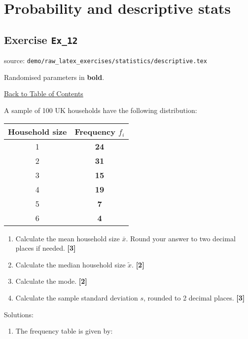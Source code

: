 \documentclass[a4paper, leqno, 12pt]{report}
\newenvironment{top_enumerate}{
\begin{enumerate}
  \setlength{\itemsep}{2em}
  \setlength{\topsep}{-0pt}
  \setlength{\partopsep}{-0pt}
}{\end{enumerate}}
\begin{document}
\section{Probability and descriptive stats}
\subsection{Exercise \texttt{Ex\_12}}
source: \texttt{demo/raw\_latex\_exercises/statistics/descriptive.tex}

Randomised parameters in \textbf{bold}. 

\hyperlink{contents}{Back to Table of Contents}
\begin{top_enumerate}
\item A sample of 100 UK households have the following distribution:

\begin{center}
\begin{tabular}{cc}
Household size & Frequency $f_i$ \\
\hline
1 & {\bf 24} \\
2 & {\bf 31} \\
3 & {\bf 15} \\
4 & {\bf 19} \\
5 & {\bf 7} \\
6 & {\bf 4} \\
\hline
\end{tabular}
\end{center}
 
\setcounter{equation}{0}  %
\begin{enumerate}
	\setlength{\topsep}{-0pt}
	\setlength{\partopsep}{-0pt}
	\setlength{\itemsep}{10pt}
			\item Calculate the mean household size $\bar x$. Round your answer to two decimal places if needed.
	 \quad \textbf{[3]}
		\item Calculate the median household size $\tilde x$.
	 \quad \textbf{[2]}
		\item Calculate the mode.
	 \quad \textbf{[2]}
		\item Calculate the sample standard deviation $s$, rounded to 2 decimal places.
	 \quad \textbf{[3]}
\end{enumerate}\addtocounter{enumi}{-1}
\item Solutions:
 
\setcounter{equation}{0}  %
\begin{enumerate}
	\setlength{\topsep}{-0pt}
	\setlength{\partopsep}{-0pt}
	\setlength{\itemsep}{10pt}
			\item The frequency table is given by:
	

\end{enumerate}
\end{top_enumerate}
\end{document}
